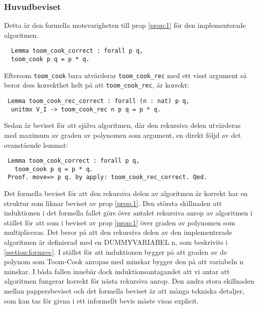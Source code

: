 \subsubsection{Huvudbeviset}
Detta är den formella motsvarigheten till prop \ref{prop:1} för den implementerade algoritmen. 
\begin{verbatim}
  Lemma toom_cook_correct : forall p q,
  toom_cook p q = p * q.
\end{verbatim}
Eftersom \verb+toom_cook+ bara utvärderar \verb+toom_cook_rec+ med ett visst argument så beror dess korrekthet
helt på att \verb+toom_cook_rec+, är korrekt:
\begin{verbatim}
 Lemma toom_cook_rec_correct : forall (n : nat) p q,
  unitmx V_I -> toom_cook_rec n p q = p * q.
\end{verbatim}
Sedan är beviset för att själva algoritmen, där den rekursiva delen utvärderas med maximum av 
graden av polynomen som argument, 
en direkt följd av det ovanstående lemmat:
\begin{verbatim}
 Lemma toom_cook_correct : forall p q,
   toom_cook p q = p * q.
 Proof. move=> p q. by apply: toom_cook_rec_correct. Qed.
\end{verbatim}
Det formella beviset för att den rekursiva delen av algoritmen är korrekt har en struktur som liknar 
beviset av prop \ref{prop:1}. Den största skillnaden att induktionen i det formella fallet görs över antalet
rekursiva anrop av algoritmen i stället för att som i beviset av prop \ref{prop:1} över graden av 
polynomen som multipliceras. Det beror på att den rekursiva delen av den implementerade algoritmen är 
definierad med en DUMMYVARIABEL n, som beskrivits i \ref{section:formrec}. I stället
för att induktionen bygger på att graden av de polynom som Toom-Cook anropas med minskar bygger den på att
variabeln n minskar. I båda 
fallen innebär dock induktionsantagandet att vi antar att algoritmen fungerar korrekt för nästa rekursiva
anrop. 
Den andra stora skillnaden mellan pappersbeviset och det formella beviset är att många tekniska detaljer, 
som kan tas för givna i ett informellt bevis måste visas explicit. 

